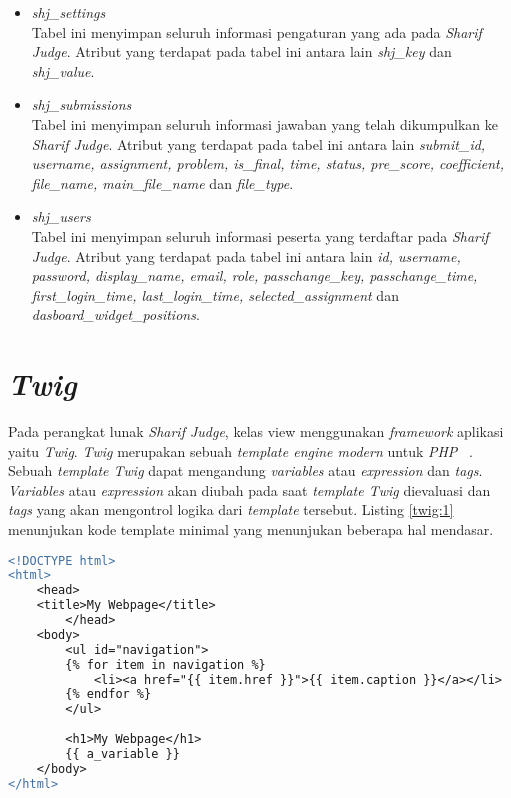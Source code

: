 \begin{itemize}
	\item \textit{shj\_settings} \\
	Tabel ini menyimpan seluruh informasi pengaturan yang ada pada \textit{Sharif Judge}. Atribut yang terdapat pada tabel ini antara lain \textit{shj\_key} dan \textit{shj\_value}.
	\item \textit{shj\_submissions} \\
	Tabel ini menyimpan seluruh informasi jawaban yang telah dikumpulkan ke \textit{Sharif Judge}. Atribut yang terdapat pada tabel ini antara lain \textit{submit\_id, username, assignment, problem, is\_final, time, status, pre\_score, coefficient, file\_name, main\_file\_name} dan \textit{file\_type}.
	\item \textit{shj\_users} \\
	Tabel ini menyimpan seluruh informasi peserta yang terdaftar pada \textit{Sharif Judge}. Atribut yang terdapat pada tabel ini antara lain \textit{id, username, password, display\_name, email, role, passchange\_key, passchange\_time, first\_login\_time, last\_login\_time, selected\_assignment} dan \textit{dasboard\_widget\_positions}.
\end{itemize}

\section{\textit{Twig}}
Pada perangkat lunak \textit{\textit{Sharif Judge}}, kelas view menggunakan \textit{framework} aplikasi yaitu \textit{Twig}. \textit{Twig} merupakan sebuah \textit{template engine modern} untuk \textit{PHP} ~\cite{fabien:09:twig}. Sebuah \textit{template Twig} dapat mengandung \textit{variables} atau \textit{expression} dan \textit{tags}. \textit{Variables} atau \textit{expression} akan diubah pada saat \textit{template Twig} dievaluasi dan \textit{tags} yang akan mengontrol logika dari \textit{template} tersebut. Listing \ref{twig:1} menunjukan kode template minimal yang menunjukan beberapa hal mendasar.

\begin{lstlisting}[language=diff, caption=Kode Template Minimal , label=twig:1, basicstyle=\ttfamily, frame=single,
columns=fullflexible, keepspaces=true]
<!DOCTYPE html>
<html>
	<head>
	<title>My Webpage</title>
		</head>
	<body>
		<ul id="navigation">
		{% for item in navigation %}
			<li><a href="{{ item.href }}">{{ item.caption }}</a></li>
		{% endfor %}
		</ul>
		
		<h1>My Webpage</h1>
		{{ a_variable }}
	</body>
</html>
\end{lstlisting}

